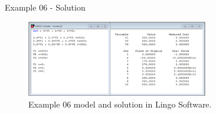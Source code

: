 \begin{frame}{Example 06 - Solution}
\begin{figure}
    \includegraphics[width=300px]{slides/ex06/screenshot.png}
    \caption{Example 06 model and solution in Lingo Software.}
\end{figure}
\end{frame}

